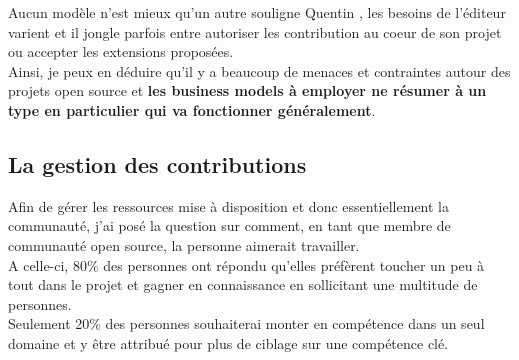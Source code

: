 			Aucun modèle n'est mieux qu'un autre souligne Quentin , les besoins de l'éditeur varient et il jongle parfois entre autoriser les contribution au coeur de son projet ou accepter les extensions proposées.\\

			Ainsi, je peux en déduire qu'il y a beaucoup de menaces et contraintes autour des projets open source et \textbf{les business models à employer ne résumer à un type en particulier qui va fonctionner généralement}.

		\subsection{La gestion des contributions}

			Afin de gérer les ressources mise à disposition et donc essentiellement la communauté, j'ai posé la question sur comment, en tant que membre de communauté open source, la personne aimerait travailler.\\

			A celle-ci, 80\% des personnes ont répondu qu'elles préfèrent toucher un peu à tout dans le projet et gagner en connaissance en sollicitant une multitude de personnes.\\

			Seulement 20\% des personnes souhaiterai monter en compétence dans un seul domaine et y être attribué pour plus de ciblage sur une compétence clé.

